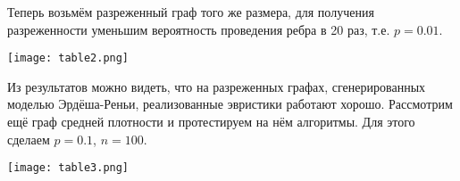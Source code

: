 Теперь возьмём разреженный граф того же размера, для получения разреженности уменьшим вероятность проведения ребра в 20 раз, т.е. $p = 0.01$.

\begin{table}[H]
	\begin{center}
		\texttt{[image: table2.png]}
		\caption{$n = 1000$, $p = 0.01$}
	\end{center}
\end{table}

Из результатов можно видеть, что на разреженных графах, сгенерированных моделью Эрдёша-Реньи, реализованные эвристики работают хорошо. Рассмотрим ещё граф средней плотности и протестируем на нём алгоритмы. Для этого сделаем $p = 0.1$, $n = 100$. 

\begin{table}[H]
	\begin{center}
		\texttt{[image: table3.png]}
		\caption{$n = 100$, $p = 0.1$}
	\end{center}
\end{table}
